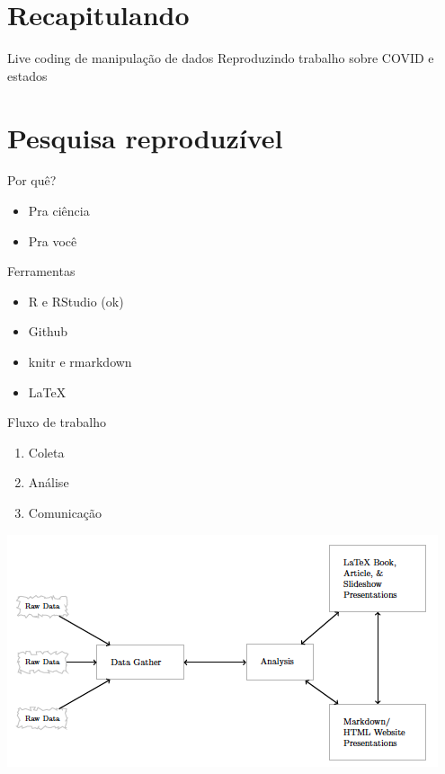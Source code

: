 \documentclass[
  9pt,
  ignorenonframetext,
]{beamer}
\begin{document}
\hypertarget{recapitulando}{%
\section{Recapitulando}\label{recapitulando}}

\begin{frame}{Live coding de manipulação de dados}
\protect\hypertarget{live-coding-de-manipulauxe7uxe3o-de-dados}{}
Reproduzindo trabalho sobre COVID e estados
\end{frame}

\hypertarget{pesquisa-reproduzuxedvel}{%
\section{Pesquisa reproduzível}\label{pesquisa-reproduzuxedvel}}

\begin{frame}{Por quê?}
\protect\hypertarget{por-quuxea}{}
\begin{itemize}
\item
  Pra ciência
\item
  Pra você
\end{itemize}
\end{frame}

\begin{frame}{Ferramentas}
\protect\hypertarget{ferramentas}{}
\begin{itemize}
\item
  R e RStudio (ok)
\item
  Github
\item
  knitr e rmarkdown
\item
  LaTeX
\end{itemize}
\end{frame}

\begin{frame}{Fluxo de trabalho}
\protect\hypertarget{fluxo-de-trabalho}{}
\begin{enumerate}
\item
  Coleta
\item
  Análise
\item
  Comunicação
\end{enumerate}
\end{frame}

\begin{frame}{}
\protect\hypertarget{section}{}
\begin{center}\includegraphics[width=1\linewidth]{imgs/fluxo_gandrud} \end{center}
\end{frame}
\end{document}
